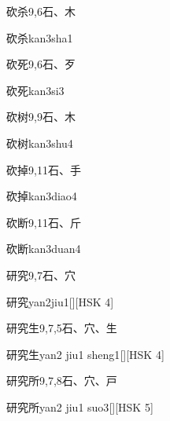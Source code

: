 \begin{entry}{砍杀}{9,6}{⽯、⽊}
  \begin{phonetics}{砍杀}{kan3sha1}
  \end{phonetics}
\end{entry}

\begin{entry}{砍死}{9,6}{⽯、⽍}
  \begin{phonetics}{砍死}{kan3si3}
  \end{phonetics}
\end{entry}

\begin{entry}{砍树}{9,9}{⽯、⽊}
  \begin{phonetics}{砍树}{kan3shu4}
  \end{phonetics}
\end{entry}

\begin{entry}{砍掉}{9,11}{⽯、⼿}
  \begin{phonetics}{砍掉}{kan3diao4}
  \end{phonetics}
\end{entry}

\begin{entry}{砍断}{9,11}{⽯、⽄}
  \begin{phonetics}{砍断}{kan3duan4}
  \end{phonetics}
\end{entry}

\begin{entry}{研究}{9,7}{⽯、⽳}
  \begin{phonetics}{研究}{yan2jiu1}[][HSK 4]
  \end{phonetics}
\end{entry}

\begin{entry}{研究生}{9,7,5}{⽯、⽳、⽣}
  \begin{phonetics}{研究生}{yan2 jiu1 sheng1}[][HSK 4]
  \end{phonetics}
\end{entry}

\begin{entry}{研究所}{9,7,8}{⽯、⽳、⼾}
  \begin{phonetics}{研究所}{yan2 jiu1 suo3}[][HSK 5]
  \end{phonetics}
\end{entry}

